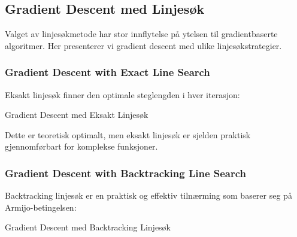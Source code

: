 \subsection{Gradient Descent med Linjesøk}
\label{subsec:gd_line_search_variants}

Valget av linjesøkmetode har stor innflytelse på ytelsen til gradientbaserte algoritmer. Her presenterer vi gradient descent med ulike linjesøkstrategier.

\subsubsection{Gradient Descent with Exact Line Search}
\label{subsubsec:gd_exact_line_search}

Eksakt linjesøk finner den optimale steglengden i hver iterasjon:

\begin{algorithm}[H]
	\caption{Gradient Descent med Eksakt Linjesøk}
\end{algorithm}

Dette er teoretisk optimalt, men eksakt linjesøk er sjelden praktisk gjennomførbart for komplekse funksjoner.

\subsubsection{Gradient Descent with Backtracking Line Search}
\label{subsubsec:gd_backtracking}

Backtracking linjesøk er en praktisk og effektiv tilnærming som baserer seg på Armijo-betingelsen:

\begin{algorithm}[H]
	\caption{Gradient Descent med Backtracking Linjesøk}
\end{algorithm}

